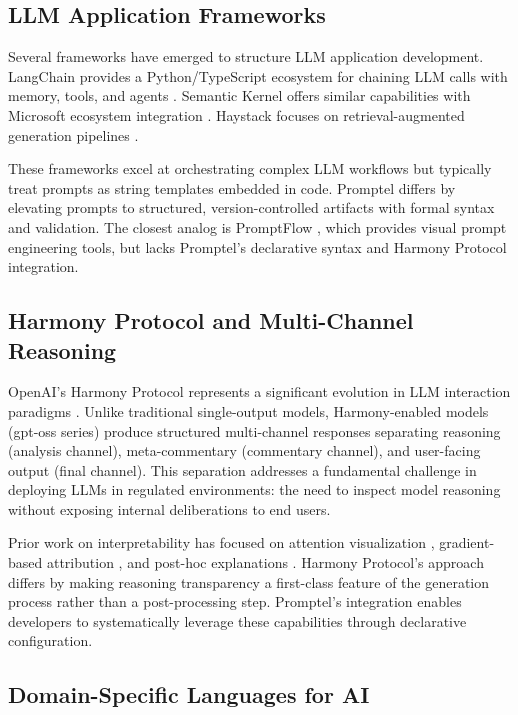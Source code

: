 \documentclass[11pt,a4paper]{article}
\begin{document}
\subsection{LLM Application Frameworks}

Several frameworks have emerged to structure LLM application development. LangChain provides a Python/TypeScript ecosystem for chaining LLM calls with memory, tools, and agents \cite{chase2022langchain}. Semantic Kernel offers similar capabilities with Microsoft ecosystem integration \cite{microsoft2023semantic}. Haystack focuses on retrieval-augmented generation pipelines \cite{pietsch2022haystack}.

These frameworks excel at orchestrating complex LLM workflows but typically treat prompts as string templates embedded in code. Promptel differs by elevating prompts to structured, version-controlled artifacts with formal syntax and validation. The closest analog is PromptFlow \cite{microsoft2023promptflow}, which provides visual prompt engineering tools, but lacks Promptel's declarative syntax and Harmony Protocol integration.

\subsection{Harmony Protocol and Multi-Channel Reasoning}

OpenAI's Harmony Protocol represents a significant evolution in LLM interaction paradigms \cite{openai2024harmony}. Unlike traditional single-output models, Harmony-enabled models (gpt-oss series) produce structured multi-channel responses separating reasoning (analysis channel), meta-commentary (commentary channel), and user-facing output (final channel). This separation addresses a fundamental challenge in deploying LLMs in regulated environments: the need to inspect model reasoning without exposing internal deliberations to end users.

Prior work on interpretability has focused on attention visualization \cite{vaswani2017attention}, gradient-based attribution \cite{sundararajan2017axiomatic}, and post-hoc explanations \cite{ribeiro2016should}. Harmony Protocol's approach differs by making reasoning transparency a first-class feature of the generation process rather than a post-processing step. Promptel's integration enables developers to systematically leverage these capabilities through declarative configuration.

\subsection{Domain-Specific Languages for AI}
\end{document}

